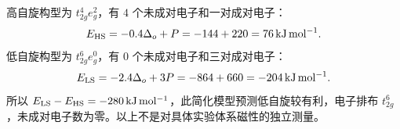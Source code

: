 高自旋构型为 $t_{2g}^4e_g^2$，有 $4$ 个未成对电子和一对成对电子：
\[E_{\rm HS}=-0.4\Delta_o+P=-144+220=76\,\mathrm{kJ\,mol^{-1}}.\]
低自旋构型为 $t_{2g}^6e_g^0$，有 $0$ 个未成对电子和三对成对电子：
\[E_{\rm LS}=-2.4\Delta_o+3P=-864+660=-204\,\mathrm{kJ\,mol^{-1}}.\]
所以 $E_{\rm LS}-E_{\rm HS}=-280\,\mathrm{kJ\,mol^{-1}}$，此简化模型预测低自旋较有利，电子排布 $t_{2g}^{6}$，未成对电子数为零。以上不是对具体实验体系磁性的独立测量。

